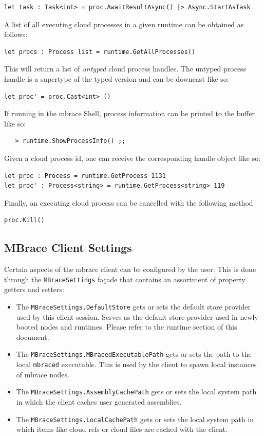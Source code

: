 \documentclass[9pt,a4paper]{article}
\newcommand{\mbrace}{mbrace}
\newcommand{\TitularMbrace}{MBrace}
\begin{document}
\begin{lstlisting}
let task : Task<int> = proc.AwaitResultAsync() |> Async.StartAsTask
\end{lstlisting}
%
A list of all executing cloud processes in a given runtime can be obtained as follows:
\begin{lstlisting}
let procs : Process list = runtime.GetAllProcesses()
\end{lstlisting}
This will return a list of \emph{untyped} cloud process handles. The untyped process handle
is a supertype of the typed version and can be downcast like so:
\begin{lstlisting}
let proc' = proc.Cast<int> ()
\end{lstlisting}
If running in the \mbrace{} Shell, process information can be printed to the buffer like so:
\begin{verbatim}
   > runtime.ShowProcessInfo() ;;
\end{verbatim}
Given a cloud process id, one can receive the corresponding handle object like so:
\begin{lstlisting}
let proc : Process = runtime.GetProcess 1131
let proc' : Process<string> = runtime.GetProcess<string> 119
\end{lstlisting}
Finally, an executing cloud process can be cancelled with the following method
\begin{lstlisting}
proc.Kill()
\end{lstlisting}

\subsection{\TitularMbrace{} Client Settings}

Certain aspects of the \mbrace{} client can be configured by the user.
This is done through the \texttt{MBraceSettings} fa\c{c}ade that contains an
assortment of property getters and setters:
\begin{itemize}
\item The \texttt{MBraceSettings.DefaultStore} gets or sets the default store provider
used by this client session. Serves as the default store provider used in newly booted
nodes and runtimes. Please refer to the runtime section of this document.
\item The \texttt{MBraceSettings.MBracedExecutablePath} gets or sets the path to the
local \texttt{mbraced} executable. This is used by the client to spawn local instances
of \mbrace{} nodes.
\item The \texttt{MBraceSettings.AssemblyCachePath} gets or sets the local system 
path in which the client caches user generated assemblies.
\item The \texttt{MBraceSettings.LocalCachePath} gets or sets the local system path
in which items like cloud refs or cloud files are cached with the client.
\end{itemize}
%
%
%
\end{document}
